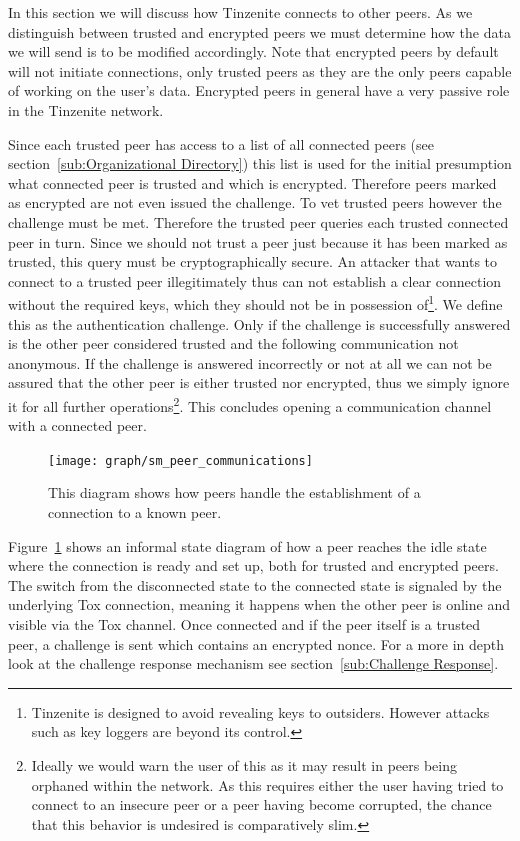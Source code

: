 In this section we will discuss how Tinzenite connects to other peers.
As we distinguish between trusted and encrypted peers we must determine how the data we will send is to be modified accordingly.
Note that encrypted peers by default will not initiate connections, only trusted peers as they are the only peers capable of working on the user's data.
Encrypted peers in general have a very passive role in the Tinzenite network.

Since each trusted peer has access to a list of all connected peers (see section~\ref{sub:Organizational Directory}) this list is used for the initial presumption what connected peer is trusted and which is encrypted.
Therefore peers marked as encrypted are not even issued the challenge.
To vet trusted peers however the challenge must be met.
Therefore the trusted peer queries each trusted connected peer in turn.
Since we should not trust a peer just because it has been marked as trusted, this query must be cryptographically secure.
An attacker that wants to connect to a trusted peer illegitimately thus can not establish a clear connection without the required keys, which they should not be in possession of\footnote{Tinzenite is designed to avoid revealing keys to outsiders. However attacks such as key loggers are beyond its control.}.
We define this as the authentication challenge.
Only if the challenge is successfully answered is the other peer considered trusted and the following communication not anonymous.
If the challenge is answered incorrectly or not at all we can not be assured that the other peer is either trusted nor encrypted, thus we simply ignore it for all further operations\footnote{Ideally we would warn the user of this as it may result in peers being orphaned within the network. As this requires either the user having tried to connect to an insecure peer or a peer having become corrupted, the chance that this behavior is undesired is comparatively slim.}.
This concludes opening a communication channel with a connected peer.

\begin{figure}[htp]
\centering
    \texttt{[image: graph/sm\_peer\_communications]}
\caption[Connection State Diagram]{This diagram shows how peers handle the establishment of a connection to a known peer.}
\label{graph:connection_states}
\end{figure}

Figure~\ref{graph:connection_states} shows an informal state diagram of how a peer reaches the idle state where the connection is ready and set up, both for trusted and encrypted peers.
The switch from the disconnected state to the connected state is signaled by the underlying Tox connection, meaning it happens when the other peer is online and visible via the Tox channel.
Once connected and if the peer itself is a trusted peer, a challenge is sent which contains an encrypted nonce.
For a more in depth look at the challenge response mechanism see section~\ref{sub:Challenge Response}.

